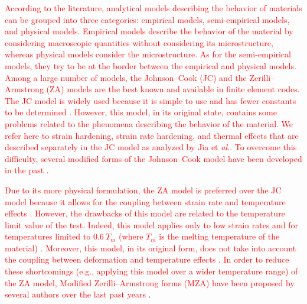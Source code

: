 \documentclass[twoside,english,1p,final,sort&compress]{elsarticle}
\makeatletter
\theoremstyle{plain}
\newcommand*{\eal}{et \emph{al.}\@\xspace}
\newcommand*{\eg}{e.g.,\@\xspace}
\makeatother
\begin{document}
\textcolor{red}{According to the literature, analytical models describing the behavior of materials can be grouped into three categories: empirical models, semi-empirical models, and physical models. Empirical models describe the behavior of the material by considering macroscopic quantities without considering its microstructure, whereas physical models consider the microstructure. As for the semi-empirical models, they try to be at the border between the empirical and physical models. Among a large number of models, the Johnson--Cook (JC) \cite{Johnson-1983-Constitutive, Johnson-1985-Fracture} and the Zerilli--Armstrong (ZA) \cite{Zerilli-1987-Dislocation} models are the best known and available in finite element codes. The JC model is widely used because it is simple to use and has fewer constants to be determined \cite{Khan-2004-Quasi-static, NematNasser-2003-Thermomechanical}. However, this model, in its original state, contains some problems related to the phenomena describing the behavior of the material. We refer here to strain hardening, strain rate hardening, and thermal effects that are described separately in the JC model as analyzed by Jia \eal \cite{Jia-2021-Modified-JC}. To overcome this difficulty, several modified forms of the Johnson--Cook model have been developed in the past \cite{Rule-1998-Revised-JC, Vural-2003-Large, Lin-2010-Modified-JC, Lin-2012-Phenomenological, Li-2013-Modified-JC, Zhou-2019-Research, Zhang-2015-Modified-JC}}.

\textcolor{red}{Due to its more physical formulation, the ZA model is preferred over the JC model because it allows for the coupling between strain rate and temperature effects \cite{Johnson-1988-Evaluation, Voyiadjis-2005-Microstructural, Dey-2007-Influence}. However, the drawbacks of this model are related to the temperature limit value of the test. Indeed, this model applies only to low strain rates and for temperatures limited to $0.6~T_m$ (where $T_m$ is the melting temperature of the material) \cite{Chiou-2005-Strain, Lee-2005-Strain, Chen-2007-Comparative, Lee-2006-Effects}. Moreover, this model, in its original form, does not take into account the coupling between deformation and temperature effects \cite{Samantaray-2009-Thermo-viscoplastic}. In order to reduce these shortcomings (\eg applying this model over a wider temperature range) of the ZA model, Modified Zerilli--Armstrong forms (MZA) have been proposed by several authors over the last past years \cite{Nemat-2004-Plasticity, Lennon-2004-Influence, Muralli-2017-Performance, Cheng-2021-Modified-ZA, Muralli-2021-Finite}}.
\end{document}
